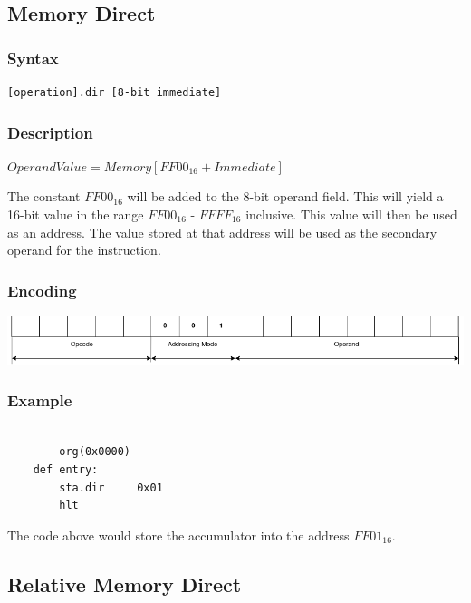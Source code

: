 \subsection{Memory Direct}\label{subsec:memory-direct-(dir)}
\subsubsection{Syntax}
\begin{verbatim}[operation].dir [8-bit immediate]\end{verbatim}

\subsubsection{Description}
$OperandValue = Memory[FF00_{16} + Immediate]$
\par The constant $FF00_{16}$ will be added to the 8-bit operand field.
This will yield a 16-bit value in the range $FF00_{16}$ - $FFFF_{16}$ inclusive.
This value will then be used as an address.
The value stored at that address will be used as the secondary operand for the instruction.

\subsubsection{Encoding}
\begin{center}
    \includegraphics[scale=0.40]{img/Andromeda-DIR.drawio}
\end{center}

\subsubsection{Example}
\begin{verbatim}

        org(0x0000)
    def entry:
        sta.dir     0x01
        hlt

\end{verbatim}
The code above would store the accumulator into the address $FF01_{16}$.
\pagebreak

\subsection{Relative Memory Direct}\label{subsec:relative-direct-(rel)}

